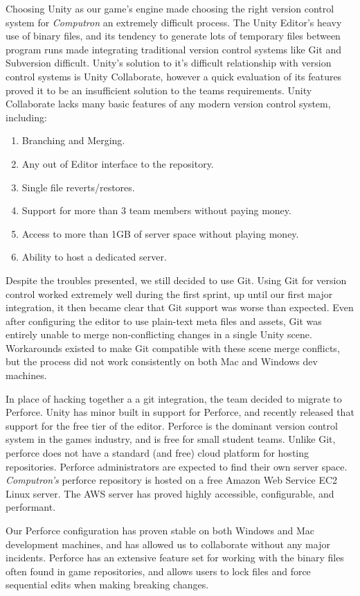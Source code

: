 Choosing Unity as our game's engine made choosing the right version control system for \textit{Computron} an extremely difficult process. The Unity Editor's heavy use of binary files, and its tendency to generate lots of temporary files between program runs made integrating traditional version control systems like Git and Subversion difficult. Unity's solution to it's difficult relationship with version control systems is Unity Collaborate, however a quick evaluation of its features proved it to be an insufficient solution to the teams requirements. Unity Collaborate lacks many basic features of any modern version control system, including: 

\begin{enumerate}
    \item Branching and Merging.
    \item Any out of Editor interface to the repository.
    \item Single file reverts/restores.
    \item Support for more than 3 team members without paying money.
    \item Access to more than 1GB of server space without playing money.
    \item Ability to host a dedicated server.
\end{enumerate}

Despite the troubles presented, we still decided  to use Git. Using Git for version control worked extremely well during the first sprint, up until our first major integration, it then became clear that Git support was worse than expected. Even after configuring the editor to use plain-text meta files and assets, Git was entirely unable to merge non-conflicting changes in a single Unity scene. Workarounds existed to make Git compatible with these scene merge conflicts, but the process did not work consistently on both Mac and Windows dev machines.

In place of hacking together a a git integration, the team decided to migrate to Perforce. Unity has minor built in support for Perforce, and recently released that support for the free tier of the editor. Perforce is the dominant version control system in the games industry, and is free for small student teams. Unlike Git, perforce does not have a standard (and free) cloud platform for hosting repositories. Perforce administrators are expected to find their own server space. \textit{Computron's} perforce repository is hosted on a free Amazon Web Service EC2 Linux server. The AWS server has proved highly accessible, configurable, and performant. 

Our Perforce configuration has proven stable on both Windows and Mac development machines, and has allowed us to collaborate without any major incidents. Perforce has an extensive feature set for working with the binary files often found in game repositories, and allows users to lock files and force sequential edits when making breaking changes.
